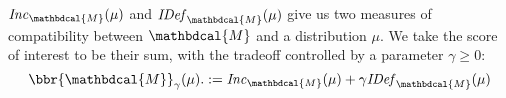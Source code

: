 \documentclass[letterpaper]{article} %
\theoremstyle{plain}
\theoremstyle{definition}
\theoremstyle{remark}
\newcommand{\thickD}{I\mkern-8muD}
\newcommand{\kldiv}{\thickD\infdivx}
\let\H\relax
\DeclareMathOperator{\H}{\mathrm{H}} %
\DeclareMathOperator*{\E}{\mathbb{E}} %
\newcommand\mat[1]{\mathbf{#1}}
\newcommand\numberthis{\addtocounter{equation}{1}\tag{\theequation}}
\def\sheq{\!=\!}
\newcommand{\bp}[1][L]{\mat{p}_{\!_{#1}\!}}
\newcommand{\Ed}{\mathcal E}
\newcommand{\dg}[1]{\mathbdcal{#1}}
\newcommand{\IDef}[1]{\mathit{IDef}_{#1}}
\newcommand\Inc{\mathit{Inc}}
\begin{document}
$\Inc_{\dg M}(\mu)$ and $\IDef{\dg M}(\mu)$ give us two measures
of compatibility between ${\dg M}$ and a distribution $\mu$.
We take the score of interest to be their sum, with the tradeoff
        controlled by a parameter $\gamma \ge 0$:
        \begin{equation}
          	  \bbr{\dg M}_\gamma(\mu).
	 := \Inc_{\dg M}(\mu) + \gamma \IDef{\dg M}(\mu)
                \label{eqn:full-score}
    	\end{equation}
\end{document}

